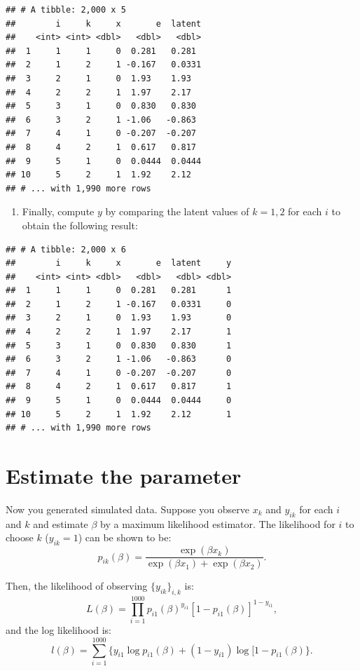 \documentclass[
]{book}
\providecommand{\tightlist}{%
  \setlength{\itemsep}{0pt}\setlength{\parskip}{0pt}}
\begin{document}
\begin{verbatim}
## # A tibble: 2,000 x 5
##        i     k     x       e  latent
##    <int> <int> <dbl>   <dbl>   <dbl>
##  1     1     1     0  0.281   0.281 
##  2     1     2     1 -0.167   0.0331
##  3     2     1     0  1.93    1.93  
##  4     2     2     1  1.97    2.17  
##  5     3     1     0  0.830   0.830 
##  6     3     2     1 -1.06   -0.863 
##  7     4     1     0 -0.207  -0.207 
##  8     4     2     1  0.617   0.817 
##  9     5     1     0  0.0444  0.0444
## 10     5     2     1  1.92    2.12  
## # ... with 1,990 more rows
\end{verbatim}

\begin{enumerate}
\def\labelenumi{\arabic{enumi}.}
\setcounter{enumi}{3}
\tightlist
\item
  Finally, compute \(y\) by comparing the latent values of \(k = 1, 2\) for each \(i\) to obtain the following result:
\end{enumerate}

\begin{verbatim}
## # A tibble: 2,000 x 6
##        i     k     x       e  latent     y
##    <int> <int> <dbl>   <dbl>   <dbl> <dbl>
##  1     1     1     0  0.281   0.281      1
##  2     1     2     1 -0.167   0.0331     0
##  3     2     1     0  1.93    1.93       0
##  4     2     2     1  1.97    2.17       1
##  5     3     1     0  0.830   0.830      1
##  6     3     2     1 -1.06   -0.863      0
##  7     4     1     0 -0.207  -0.207      0
##  8     4     2     1  0.617   0.817      1
##  9     5     1     0  0.0444  0.0444     0
## 10     5     2     1  1.92    2.12       1
## # ... with 1,990 more rows
\end{verbatim}

\hypertarget{estimate-the-parameter}{%
\section{Estimate the parameter}\label{estimate-the-parameter}}

Now you generated simulated data. Suppose you observe \(x_k\) and \(y_{ik}\) for each \(i\) and \(k\) and estimate \(\beta\) by a maximum likelihood estimator. The likelihood for \(i\) to choose \(k\) (\(y_{ik} = 1\)) can be shown to be:
\[
p_{ik}(\beta) = \frac{\exp(\beta x_k)}{\exp(\beta x_1) + \exp(\beta x_2)}.
\]

Then, the likelihood of observing \(\{y_{ik}\}_{i, k}\) is:
\[
L(\beta) = \prod_{i = 1}^{1000} p_{i1}(\beta)^{y_{i1}} [1 - p_{i1}(\beta)]^{1 - y_{i1}},
\]
and the log likelihood is:
\[
l(\beta) = \sum_{i = 1}^{1000}\{y_{i1}\log p_{i1}(\beta) + (1 - y_{i1})\log [1 - p_{i1}(\beta)\}.
\]
\end{document}
